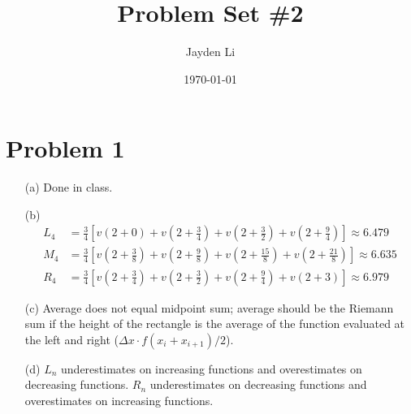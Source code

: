 \documentclass[preview, margin=0.6in]{standalone}
\title{\vspace*{-30pt}Problem Set \#2}
\author{Jayden Li}
\date{\today}
\newcommand*{\problem}[1]{\section*{Problem #1}}
\begin{document}
\fontsize{12pt}{12pt}\selectfont
\setlength{\abovedisplayskip}{0pt}
\maketitle
\problem{1}
\begin{itemize}
	\item[(a)] Done in class.
	\item[(b)]
		\begin{align*}
			L_4&=\frac34\left[v(2+0)+v\left(2+\frac34\right)+v\left(2+\frac32\right)+v\left(2+\frac94\right)\right]
			\approx6.479 \\
			M_4&=\frac34\left[v\left(2+\frac38\right)+v\left(2+\frac98\right)+v\left(2+\frac{15}8\right)+v\left(2+\frac{21}8\right)\right]
			\approx6.635 \\
			R_4&=\frac34\left[v\left(2+\frac34\right)+v\left(2+\frac32\right)+v\left(2+\frac94\right)+v\left(2+3\right)\right]
			\approx6.979
		\end{align*}
	\item[(c)]
		Average does not equal midpoint sum; average should be the Riemann sum if the height of the rectangle is the average of the function evaluated at the left and right ($\Delta x\cdot f(x_{i}+x_{i+1})/2$).
	\item[(d)]
		$L_n$ underestimates on increasing functions and overestimates on decreasing functions. $R_n$ underestimates on decreasing functions and overestimates on increasing functions.
\end{itemize}
\end{document}
